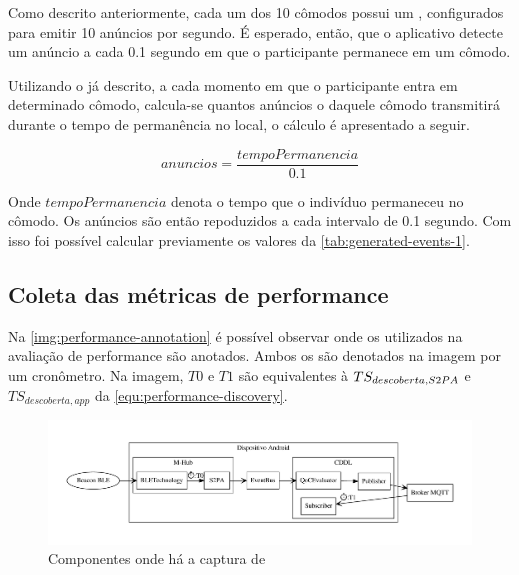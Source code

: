 Como descrito anteriormente, cada um dos 10 cômodos possui um \beacon \ble, configurados para emitir 10 anúncios por segundo. É esperado, então,  que o aplicativo detecte um anúncio a cada 0.1 segundo em que o participante permanece em um cômodo. 

Utilizando o \dataset já descrito, a cada momento em que o participante entra em determinado cômodo, calcula-se quantos anúncios o \beacon daquele cômodo transmitirá durante o tempo de permanência no local, o cálculo é apresentado a seguir.

\begin{equation}
	anuncios = \frac{tempoPermanencia}{0.1} 
\end{equation}

Onde $tempoPermanencia$ denota o tempo que o indivíduo permaneceu no cômodo. Os anúncios são então repoduzidos a cada intervalo de 0.1 segundo. Com isso foi possível calcular previamente os valores da \autoref{tab:generated-events-1}.

\subsection{Coleta das métricas de performance}

Na \autoref{img:performance-annotation} é possível observar onde os \timestamps utilizados na avaliação de performance são anotados. Ambos os \timestamps são denotados na imagem por um cronômetro. Na imagem, $T0$ e $T1$ são equivalentes à $TS_{descoberta,S2PA}$ e $TS_{descoberta,app}$ da \autoref{equ:performance-discovery}.

\begin{figure}[htb]
	
	\begin{center}

		\caption{\label{img:performance-annotation}Componentes onde há a captura de \timestamps}
		\includegraphics[width=0.95\linewidth]{img/performance-annotation}
		\fonte{\autoriapropria}

	\end{center}
	
\end{figure}


